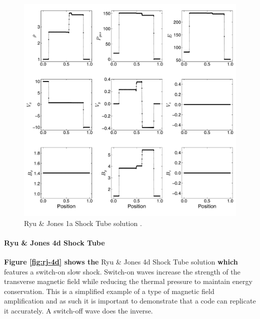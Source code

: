 \documentclass[modern, linenumbers]{aastex631}
\newcommand*{\img}[1]{%
    \raisebox{-.05\baselineskip}{%
        \texttt{[image: \#1]}%
    }%
}
\begin{document}
\begin{figure}[ht!]
    \includegraphics[width=\linewidth]{rj1a.pdf}
    \caption{Ryu \& Jones 1a Shock Tube solution \citep{ryu_jones_1995}.
    \href{https://zenodo.org/records/10927223}{\img{zenodo-gradient-200.png}}}
    \label{fig:rj-1a}
\end{figure}

\paragraph{Ryu \& Jones 4d Shock Tube}
\textbf{Figure \ref{fig:rj-4d} shows the} Ryu \& Jones 4d Shock Tube solution \citep{ryu_jones_1995} \textbf{which} features a switch-on slow shock. Switch-on waves increase the strength of the transverse magnetic field while reducing the thermal pressure to maintain energy conservation. This is a simplified example of a type of magnetic field amplification and as such it is important to demonstrate that a code can replicate it accurately. A switch-off wave does the inverse.
\end{document}
